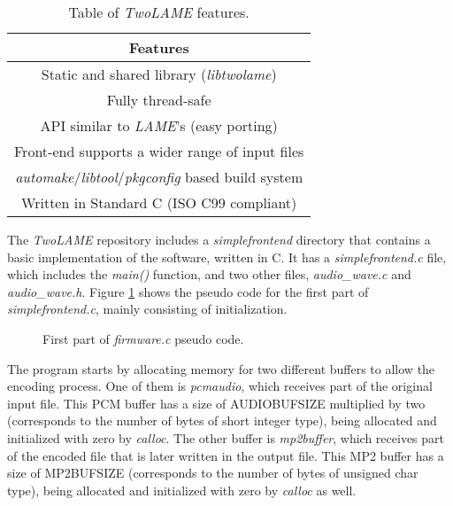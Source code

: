 \vspace{0.5cm}

\begin{table}[H]
    \centering
    \begin{tabular}{|c|}
        \hline
        \textbf{Features} \\
        \hline
         Static and shared library (\textit{libtwolame}) \\
         \hline
         Fully thread-safe\\
         \hline
         API similar to \textit{LAME}'s (easy porting) \\
         \hline
         Front-end supports a wider range of input files \\
         \hline
         \textit{automake}/\textit{libtool}/\textit{pkgconfig} based build system \\
         \hline
         Written in Standard C (ISO C99 compliant)\\
         \hline
    \end{tabular}
    \caption{Table of \textit{TwoLAME} features.}
    \label{tab:twolame}
\end{table}

The \textit{TwoLAME} repository includes a \textit{simplefrontend} directory that contains a basic implementation of the software, written in C.
It has a \textit{simplefrontend.c} file, which includes the \textit{main()} function, and two other files, \textit{audio\_wave.c} and \textit{audio\_wave.h}.
Figure \ref{pseudo1} shows the pseudo code for the first part of \textit{simplefrontend.c}, mainly consisting of initialization.

\begin{figure}[H]
\centerline{}
\caption{First part of \textit{firmware.c} pseudo code.}
\label{pseudo1}
\end{figure}


The program starts by allocating memory for two different buffers to allow the encoding process. One of them is \textit{pcmaudio}, which receives part of the original input file. This PCM buffer has a size of AUDIOBUFSIZE multiplied by two (corresponds to the number of bytes of short integer type), being allocated and initialized with zero by \textit{calloc}. The other buffer is \textit{mp2buffer}, which receives part of the encoded file that is later written in the output file. This MP2 buffer has a size of MP2BUFSIZE (corresponds to the number of bytes of unsigned char type), being allocated and initialized with zero by \textit{calloc} as well.

